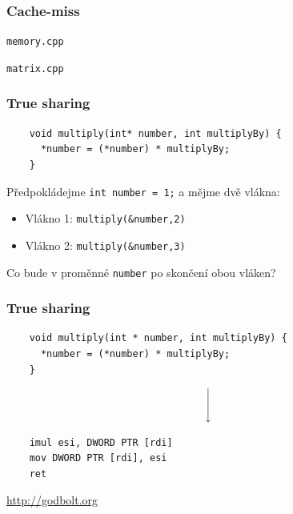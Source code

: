 \documentclass[usenames,dvipsnames,9pt]{beamer}
\newcommand{\see}[1]{\faEye\hspace{5pt}#1}
\begin{document}
\begin{frame}
  \frametitle{Cache-miss}

  \see{\tt{memory.cpp}}

  \vspace{2em}

  \see{\tt{matrix.cpp}}
\end{frame}

\begin{frame}[fragile]
  \frametitle{True sharing}
  \begin{verbatim}
    void multiply(int* number, int multiplyBy) {
      *number = (*number) * multiplyBy;
    }
  \end{verbatim}
  \vspace{1.5em}
  Předpokládejme \texttt{int number = 1;} a mějme dvě vlákna:
  \begin{itemize}
    \item Vlákno 1: \texttt{multiply(&number,2)}
    \item Vlákno 2: \texttt{multiply(&number,3)}
  \end{itemize}
  Co bude v proměnné \texttt{number} po skončení obou vláken?
\end{frame}
\begin{frame}[fragile]
  \frametitle{True sharing}
  \begin{verbatim}
    void multiply(int * number, int multiplyBy) {
      *number = (*number) * multiplyBy;
    }
  \end{verbatim}
  \vspace{1em}\[ \Bigg\downarrow \]\vspace{1em}
  \begin{verbatim}
    imul esi, DWORD PTR [rdi]
    mov DWORD PTR [rdi], esi
    ret
  \end{verbatim}

  \pause

  \vspace{1.5em}
  {\hfill\see{\url{http://godbolt.org}}}
\end{frame}
\end{document}
